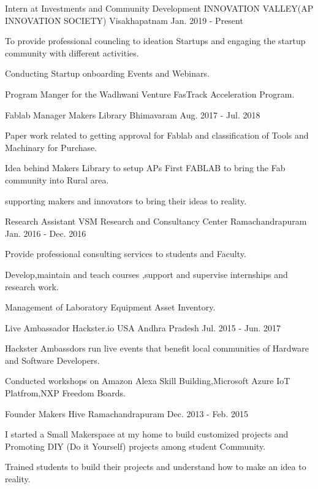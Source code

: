 \begin{cventries}
  \cventry
    {Intern at Investments and Community Development}
    {INNOVATION VALLEY(AP INNOVATION SOCIETY)}
    {Visakhapatnam}
    {Jan. 2019 - Present}
    {
      \begin{cvitems}
        \item {To provide professional councling to ideation Startups and engaging the startup community with different activities.}
        \item {Conducting Startup onboarding Events and Webinars.}
        \item {Program Manger for the Wadhwani Venture FasTrack Acceleration Program.}
      \end{cvitems}
    }
  \cventry
    {Fablab Manager}
    {Makers Library}
    {Bhimavaram}
    {Aug. 2017 - Jul. 2018}
    {
      \begin{cvitems}
        \item {Paper work related to getting approval for Fablab and classification of Tools and Machinary for Purchase.}
	\item{Idea behind Makers Library to setup APs First FABLAB to bring the Fab community into Rural area.}
        \item {supporting makers and innovators to bring their ideas to reality.}
      \end{cvitems}
    }
  \cventry
    {Research Assistant}
    {VSM Research and Consultancy Center}
    {Ramachandrapuram}
    {Jan. 2016 - Dec. 2016}
    {
      \begin{cvitems}
        \item {Provide professional consulting services to students and Faculty.}
	\item{Develop,maintain and teach courses ,support and supervise internships and research work.}
        \item {Management of Laboratory Equipment Asset Inventory.}
      \end{cvitems} 
    }
  \cventry
    {Live Ambassador}
    {Hackster.io USA}
    {Andhra Pradesh}
    {Jul. 2015 - Jun. 2017}
    {
      \begin{cvitems}
        \item {Hackster Ambassdors run live events that benefit local communities of Hardware and Software Developers.}
	\item{Conducted workshops on Amazon Alexa Skill Building,Microsoft Azure IoT Platfrom,NXP Freedom Boards.}
      \end{cvitems}
    }
  \cventry
    {Founder}
    {Makers Hive}
    {Ramachandrapuram}
    {Dec. 2013 - Feb. 2015}
    {
      \begin{cvitems}
        \item {I started a Small Makerspace at my home to build customized projects and Promoting DIY (Do it Yourself) projects among student Community. }
	\item{Trained students to build their projects and understand how to make an idea to reality.}
      \end{cvitems}
    }
\end{cventries}
